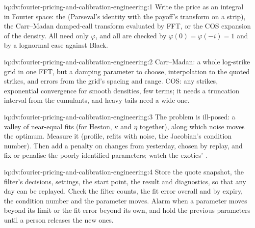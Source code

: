 \begin{solution}{iq:dv:fourier-pricing-and-calibration-engineering:1}
Write the price as an integral in Fourier space: the  (Parseval's identity with the payoff's transform on a strip), the Carr--Madan
damped-call transform evaluated by FFT, or the COS expansion of the density. All need only $\varphi$, and all are checked by $\varphi(0)=\varphi(-i)=1$
and by a lognormal case against Black.
\end{solution}

\begin{solution}{iq:dv:fourier-pricing-and-calibration-engineering:2}
Carr--Madan: a whole log-strike grid in one FFT, but a damping parameter to choose, interpolation to the quoted strikes, and errors from the grid's
spacing and range. COS: any strikes, exponential convergence for smooth densities, few terms; it needs a truncation interval from the cumulants,
and heavy tails need a wide one.
\end{solution}

\begin{solution}{iq:dv:fourier-pricing-and-calibration-engineering:3}
The problem is ill-posed: a valley of near-equal fits (for Heston, $\kappa$ and $\eta$ together), along which noise moves the optimum. Measure it
(profile, refits with noise, the Jacobian's condition number). Then add a penalty on changes from yesterday, chosen by replay, and fix or penalise
the poorly identified parameters; watch the exotics' .
\end{solution}

\begin{solution}{iq:dv:fourier-pricing-and-calibration-engineering:4}
Store the quote snapshot, the filter's decisions, settings, the start point, the result and diagnostics, so that any day can be replayed. Check the
filter counts, the fit error overall and by expiry, the condition number and the parameter moves. Alarm when a parameter moves beyond its limit or
the fit error beyond its own, and hold the previous parameters until a person releases the new ones.
\end{solution}

